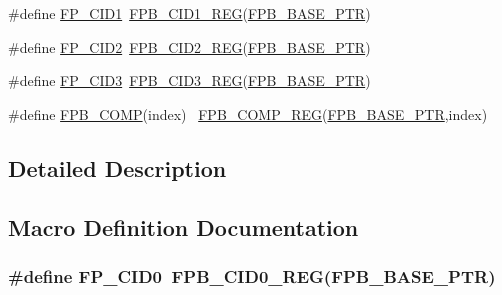 \begin{DoxyCompactItemize}
\item 
\#define \hyperlink{group___f_p_b___register___accessor___macros_gae72090dc299cc0ce88752ac1aef4a17f}{F\+P\+\_\+\+C\+I\+D1}~\hyperlink{group___f_p_b___register___accessor___macros_ga6fb403a75294c6d76d2bdf8156620f33}{F\+P\+B\+\_\+\+C\+I\+D1\+\_\+\+R\+EG}(\hyperlink{group___f_p_b___peripheral_ga95d994c97f967ce02339465def6bac95}{F\+P\+B\+\_\+\+B\+A\+S\+E\+\_\+\+P\+TR})
\item 
\#define \hyperlink{group___f_p_b___register___accessor___macros_ga8567b72cab0a5adaed761d5b545f678e}{F\+P\+\_\+\+C\+I\+D2}~\hyperlink{group___f_p_b___register___accessor___macros_ga36d0d49963902114ed3fcf12f2a4226a}{F\+P\+B\+\_\+\+C\+I\+D2\+\_\+\+R\+EG}(\hyperlink{group___f_p_b___peripheral_ga95d994c97f967ce02339465def6bac95}{F\+P\+B\+\_\+\+B\+A\+S\+E\+\_\+\+P\+TR})
\item 
\#define \hyperlink{group___f_p_b___register___accessor___macros_gacb056c6cfc1741d7d65a4ceb25b0c9ff}{F\+P\+\_\+\+C\+I\+D3}~\hyperlink{group___f_p_b___register___accessor___macros_ga69bcecf152c05571bbcdb2160cacbd45}{F\+P\+B\+\_\+\+C\+I\+D3\+\_\+\+R\+EG}(\hyperlink{group___f_p_b___peripheral_ga95d994c97f967ce02339465def6bac95}{F\+P\+B\+\_\+\+B\+A\+S\+E\+\_\+\+P\+TR})
\item 
\#define \hyperlink{group___f_p_b___register___accessor___macros_ga790522742b01d47ba97e4977225c8067}{F\+P\+B\+\_\+\+C\+O\+MP}(index)                                                ~\hyperlink{group___f_p_b___register___accessor___macros_ga52fd8faa26cc52d39d15e4897e218bcb}{F\+P\+B\+\_\+\+C\+O\+M\+P\+\_\+\+R\+EG}(\hyperlink{group___f_p_b___peripheral_ga95d994c97f967ce02339465def6bac95}{F\+P\+B\+\_\+\+B\+A\+S\+E\+\_\+\+P\+TR},index)
\end{DoxyCompactItemize}


\subsection{Detailed Description}


\subsection{Macro Definition Documentation}
\subsubsection[{\texorpdfstring{F\+P\+\_\+\+C\+I\+D0}{FP_CID0}}]{\setlength{\rightskip}{0pt plus 5cm}\#define F\+P\+\_\+\+C\+I\+D0~{\bf F\+P\+B\+\_\+\+C\+I\+D0\+\_\+\+R\+EG}({\bf F\+P\+B\+\_\+\+B\+A\+S\+E\+\_\+\+P\+TR})}\hypertarget{group___f_p_b___register___accessor___macros_ga52c7dddc23c33f6c4cec456ab5006cfe}{}\label{group___f_p_b___register___accessor___macros_ga52c7dddc23c33f6c4cec456ab5006cfe}


